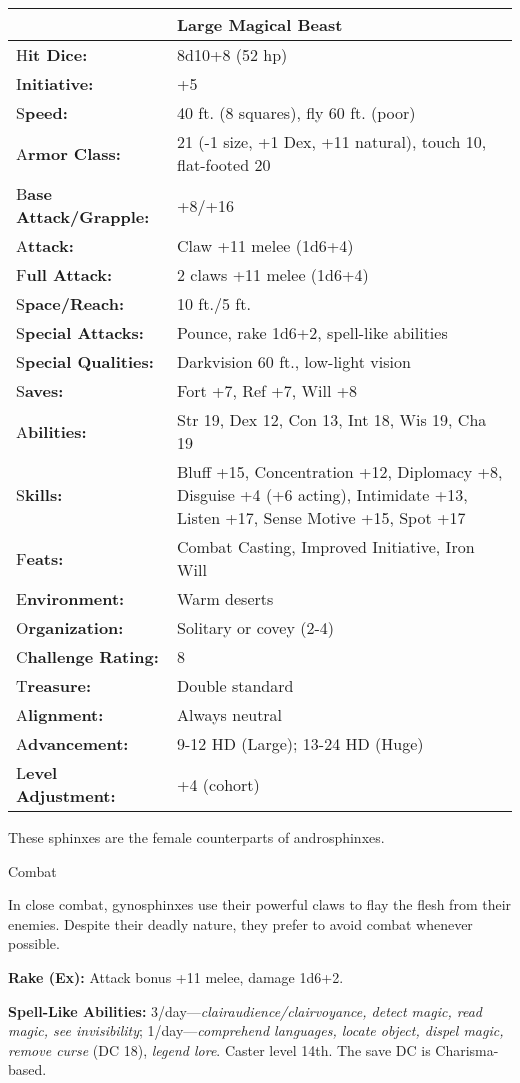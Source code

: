 \documentclass{article}
\begin{document}
\begin{tabular}{|>{\raggedright}p{86pt}|>{\raggedright}p{239pt}|}
\hline
  & Large Magical Beast\tabularnewline
\hline
H\textbf{it Dice:} & 8d10+8 (52 hp)\tabularnewline
\hline
I\textbf{nitiative:} & +5\tabularnewline
\hline
S\textbf{peed:} & 40 ft. (8 squares), fly 60 ft. (poor)\tabularnewline
\hline
A\textbf{rmor Class:} & 21 (-1 size, +1 Dex, +11 natural), touch 10, flat-footed 
20\tabularnewline
\hline
B\textbf{ase Attack/Grapple:} & +8/+16\tabularnewline
\hline
A\textbf{ttack:} & Claw +11 melee (1d6+4)\tabularnewline
\hline
F\textbf{ull Attack:} & 2 claws +11 melee (1d6+4)\tabularnewline
\hline
S\textbf{pace/Reach:} & 10 ft./5 ft.\tabularnewline
\hline
S\textbf{pecial Attacks:} & Pounce, rake 1d6+2, spell-like abilities\tabularnewline
\hline
S\textbf{pecial Qualities:} & Darkvision 60 ft., low-light vision\tabularnewline
\hline
S\textbf{aves:} & Fort +7, Ref +7, Will +8\tabularnewline
\hline
A\textbf{bilities:} & Str 19, Dex 12, Con 13, Int 18, Wis 19, Cha 19\tabularnewline
\hline
S\textbf{kills:} & Bluff +15, Concentration +12, Diplomacy +8, Disguise +4 (+6 
acting), Intimidate +13, Listen +17, Sense Motive +15, Spot +17\tabularnewline
\hline
F\textbf{eats:} & Combat Casting, Improved Initiative, Iron Will\tabularnewline
\hline
E\textbf{nvironment:} & Warm deserts\tabularnewline
\hline
O\textbf{rganization:} & Solitary or covey (2-4)\tabularnewline
\hline
C\textbf{hallenge Rating:} & 8\tabularnewline
\hline
T\textbf{reasure:} & Double standard\tabularnewline
\hline
A\textbf{lignment:} & Always neutral\tabularnewline
\hline
A\textbf{dvancement:} & 9-12 HD (Large); 13-24 HD (Huge)\tabularnewline
\hline
L\textbf{evel Adjustment:} & +4 (cohort)\tabularnewline
\hline
\end{tabular}

These sphinxes are the female counterparts of androsphinxes. 

Combat

In close combat, gynosphinxes use their powerful claws to flay the flesh from their 
enemies. Despite their deadly nature, they prefer to avoid combat whenever possible.

\textbf{Rake (Ex):} Attack bonus +11 melee, damage 1d6+2.

\textbf{Spell-Like Abilities:} 3/day---\textit{clairaudience/clairvoyance, detect 
magic, read magic, see invisibility}; 1/day---\textit{comprehend languages, locate 
object, dispel magic, remove curse }(DC 18), \textit{legend lore}. Caster level 
14th. The save DC is Charisma-based.
\end{document}
